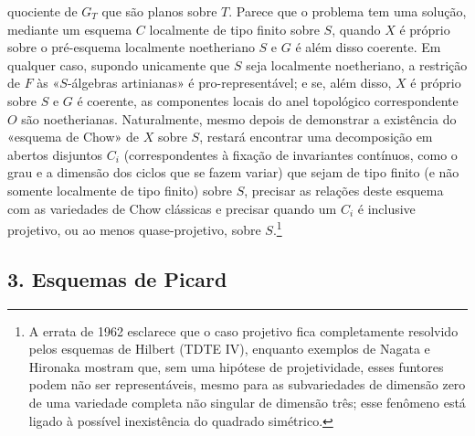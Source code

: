 quociente de $G_T$ que são planos sobre $T$. Parece que o problema tem uma
solução, mediante um esquema $C$ localmente de tipo finito sobre $S$, quando
$X$ é próprio sobre o pré-esquema localmente noetheriano $S$ e $G$ é além disso
coerente. Em qualquer caso, supondo unicamente que $S$ seja localmente
noetheriano, a restrição de $F$ às «$S$-álgebras artinianas» é
pro-representável; e se, além disso, $X$ é próprio sobre $S$ e $G$ é coerente, as
componentes locais do anel topológico correspondente $O$ são
noetherianas. Naturalmente, mesmo depois de demonstrar a existência do
«esquema de Chow» de $X$ sobre $S$, restará
encontrar uma decomposição em abertos disjuntos $C_i$ (correspondentes à
fixação de invariantes contínuos, como o grau e a dimensão dos
ciclos que se fazem variar) que sejam de tipo finito (e não somente localmente de
tipo finito) sobre $S$, precisar as relações deste esquema com as
variedades de Chow clássicas e precisar quando um $C_i$ é inclusive projetivo,
ou ao menos quase-projetivo, sobre $S$.\footnote{A errata de 1962
esclarece que o caso projetivo fica completamente resolvido pelos esquemas de
Hilbert (TDTE IV), enquanto exemplos de Nagata e Hironaka mostram que, sem
uma hipótese de projetividade, esses funtores podem não ser representáveis,
mesmo para as subvariedades de dimensão zero de uma variedade completa não
singular de dimensão três; esse fenômeno está ligado à possível
inexistência do quadrado simétrico.}

\subsection*{3. Esquemas de Picard}

